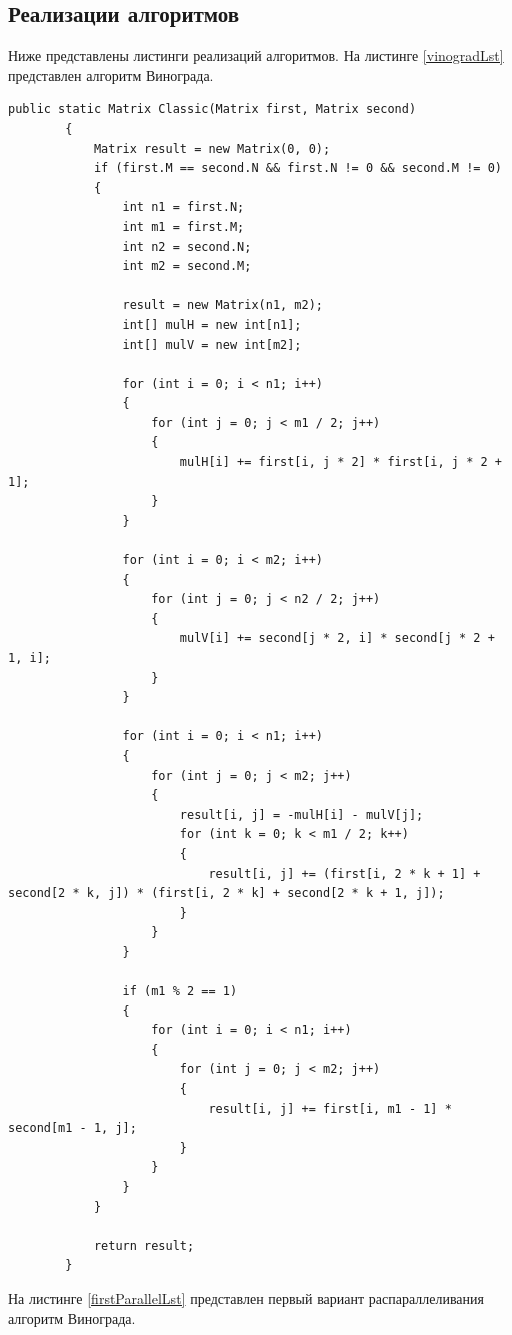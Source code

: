 \documentclass{article}
\begin{document}
	\subsection{Реализации алгоритмов}
	Ниже представлены листинги реализаций алгоритмов.
	На листинге \hyperref[vinogradLst]{\ref{vinogradLst}} представлен алгоритм Винограда.
	\begin{lstlisting}[label=vinogradLst, caption=Алгоритм Винограда]
	public static Matrix Classic(Matrix first, Matrix second)
        {
            Matrix result = new Matrix(0, 0);
            if (first.M == second.N && first.N != 0 && second.M != 0)
            {
                int n1 = first.N;
                int m1 = first.M;
                int n2 = second.N;
                int m2 = second.M;

                result = new Matrix(n1, m2);
                int[] mulH = new int[n1];
                int[] mulV = new int[m2];

                for (int i = 0; i < n1; i++)
                {
                    for (int j = 0; j < m1 / 2; j++)
                    {
                        mulH[i] += first[i, j * 2] * first[i, j * 2 + 1];
                    }
                }

                for (int i = 0; i < m2; i++)
                {
                    for (int j = 0; j < n2 / 2; j++)
                    {
                        mulV[i] += second[j * 2, i] * second[j * 2 + 1, i];
                    }
                }

                for (int i = 0; i < n1; i++)
                {
                    for (int j = 0; j < m2; j++)
                    {
                        result[i, j] = -mulH[i] - mulV[j];
                        for (int k = 0; k < m1 / 2; k++)
                        {
                            result[i, j] += (first[i, 2 * k + 1] + second[2 * k, j]) * (first[i, 2 * k] + second[2 * k + 1, j]);
                        }
                    }
                }

                if (m1 % 2 == 1)
                {
                    for (int i = 0; i < n1; i++)
                    {
                        for (int j = 0; j < m2; j++)
                        {
                            result[i, j] += first[i, m1 - 1] * second[m1 - 1, j];
                        }
                    }
                }
            }

            return result;
        }
	\end{lstlisting}
		На листинге \hyperref[firstParallelLst]{\ref{firstParallelLst}} представлен первый вариант распараллеливания алгоритм Винограда.
\end{document}
